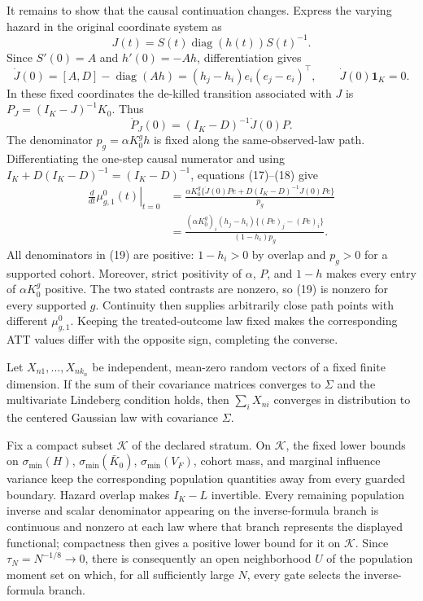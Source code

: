 It remains to show that the causal continuation changes.  Express the varying hazard in the original coordinate system as
\[
 J(t)=S(t)\operatorname{diag}(h(t))S(t)^{-1}.
\]
Since \(S'(0)=A\) and \(h'(0)=-Ah\), differentiation gives
\[
 \dot J(0)=[A,D]-\operatorname{diag}(Ah)
 =(h_j-h_i)e_i(e_j-e_i)^{\top},
 \qquad \dot J(0)\mathbf 1_K=0.                              \tag{17}
\]
In these fixed coordinates the de-killed transition associated with \(J\) is \(P_J=(I_K-J)^{-1}K_0\).  Thus
\[
 \dot P_J(0)=(I_K-D)^{-1}\dot J(0)P.                         \tag{18}
\]
The denominator \(p_g=\alpha K_0^gh\) is fixed along the same-observed-law path.  Differentiating the one-step causal numerator and using \(I_K+D(I_K-D)^{-1}=(I_K-D)^{-1}\), equations (17)--(18) give
\[
\begin{aligned}
 \left.\frac{d}{dt}\mu^0_{g,1}(t)\right|_{t=0}
 &=\frac{\alpha K_0^g\{\dot J(0)Pe+D(I_K-D)^{-1}\dot J(0)Pe\}}{p_g}\\
 &=\frac{(\alpha K_0^g)_i(h_j-h_i)\{(Pe)_j-(Pe)_i\}}{(1-h_i)p_g}. \tag{19}
\end{aligned}
\]
All denominators in (19) are positive: \(1-h_i>0\) by overlap and \(p_g>0\) for a supported cohort.  Moreover, strict positivity of \(\alpha\), \(P\), and \(1-h\) makes every entry of \(\alpha K_0^g\) positive.  The two stated contrasts are nonzero, so (19) is nonzero for every supported \(g\).  Continuity then supplies arbitrarily close path points with different \(\mu^0_{g,1}\).  Keeping the treated-outcome law fixed makes the corresponding ATT values differ with the opposite sign, completing the converse.

Let \(X_{n1},\ldots,X_{nk_n}\) be independent, mean-zero random vectors of a fixed finite dimension.  If the sum of their covariance matrices converges to \(\Sigma\) and the multivariate Lindeberg condition holds, then \(\sum_iX_{ni}\) converges in distribution to the centered Gaussian law with covariance \(\Sigma\).

Fix a compact subset \(\mathcal K\) of the declared stratum.  On \(\mathcal K\), the fixed lower bounds on \(\sigma_{\min}(H)\), \(\sigma_{\min}(\bar K_0)\), \(\sigma_{\min}(V_F)\), cohort mass, and marginal influence variance keep the corresponding population quantities away from every guarded boundary.  Hazard overlap makes \(I_K-L\) invertible.  Every remaining population inverse and scalar denominator appearing on the inverse-formula branch is continuous and nonzero at each law where that branch represents the displayed functional; compactness then gives a positive lower bound for it on \(\mathcal K\).  Since \(\tau_N=N^{-1/8}\to0\), there is consequently an open neighborhood \(U\) of the population moment set on which, for all sufficiently large \(N\), every gate selects the inverse-formula branch.

